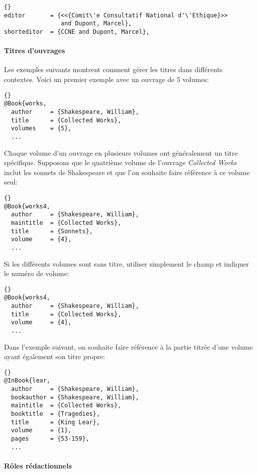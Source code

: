 \documentclass{ltxdockit}
\begin{document}
\begin{lstlisting}[style=bibtex]{}
editor       = {<<{Comit\'e Consultatif National d'\'Ethique}>>
                and Dupont, Marcel},
shorteditor  = {CCNE and Dupont, Marcel},
\end{lstlisting}

\paragraph{Titres d'ouvrages}

Les exemples suivants montrent comment gérer les titres dans différents contextes.
Voici un premier exemple avec un ouvrage de 5 volumes:

\begin{lstlisting}[style=bibtex]{}
@Book{works,
  author     = {Shakespeare, William},
  title      = {Collected Works},
  volumes    = {5},
  ...
\end{lstlisting}
%
Chaque volume d'un ouvrage en plusieurs volumes ont généralement un titre spécifique. Supposons que le quatrième volume de l'ouvrage \emph{Collected Works} inclut les sonnets de Shakespeare et que l'on souhaite faire référence à ce volume seul:

\begin{lstlisting}[style=bibtex]{}
@Book{works4,
  author     = {Shakespeare, William},
  maintitle  = {Collected Works},
  title      = {Sonnets},
  volume     = {4},
  ...
\end{lstlisting}
%
Si les différents volumes sont sans titre, utiliser simplement le champ  et indiquer le numéro de volume:

\begin{lstlisting}[style=bibtex]{}
@Book{works4,
  author     = {Shakespeare, William},
  title      = {Collected Works},
  volume     = {4},
  ...
\end{lstlisting}
%
Dans l'exemple suivant, on souhaite faire référence à la partie titrée d'une volume ayant également son titre propre:

\begin{lstlisting}[style=bibtex]{}
@InBook{lear,
  author     = {Shakespeare, William},
  bookauthor = {Shakespeare, William},
  maintitle  = {Collected Works},
  booktitle  = {Tragedies},
  title      = {King Lear},
  volume     = {1},
  pages      = {53-159},
  ...
\end{lstlisting}

\paragraph{Rôles rédactionnels}
\label{roles}
\end{document}
